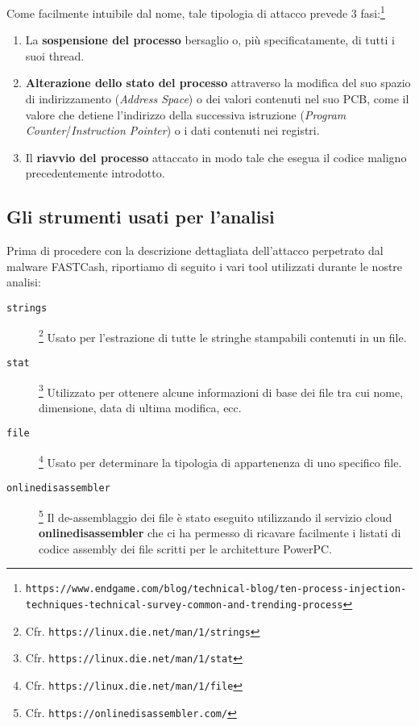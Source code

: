 \documentclass[10pt,a4paper, titlepage]{report}
\begin{document}
Come facilmente intuibile dal nome, tale tipologia di attacco prevede 3 fasi:\footnote{\texttt{https://www.endgame.com/blog/technical-blog/ten-process-injection-techniques-technical-survey-common-and-trending-process}}
\begin{enumerate}
\item La \textbf{sospensione del processo} bersaglio o, più specificatamente, di tutti i suoi thread. 
\item \textbf{Alterazione dello stato del processo} attraverso la modifica del suo spazio di indirizzamento (\textit{Address Space}) o dei valori contenuti nel suo PCB, come il valore che detiene l'indirizzo della successiva istruzione (\textit{Program Counter}/\textit{Instruction Pointer}) o i dati contenuti nei registri.
\item Il \textbf{riavvio del processo} attaccato in modo tale che esegua il codice maligno precedentemente introdotto.
\end{enumerate}

\subsection{Gli strumenti usati per l'analisi}

Prima di procedere con la descrizione dettagliata dell'attacco perpetrato dal malware FASTCash, riportiamo di seguito i vari tool utilizzati durante le nostre analisi:

\begin{description}
\item[\texttt{strings}]\footnote{Cfr. \texttt{https://linux.die.net/man/1/strings}} Usato per l'estrazione di tutte le stringhe stampabili contenuti in un file.
\item[\texttt{stat}]\footnote{Cfr. \texttt{https://linux.die.net/man/1/stat}} Utilizzato per ottenere alcune informazioni di base dei file tra cui nome, dimensione, data di ultima modifica, ecc.
\item[\texttt{file}]\footnote{Cfr. \texttt{https://linux.die.net/man/1/file}} Usato per determinare la tipologia di appartenenza di uno specifico file.
\item[\texttt{onlinedisassembler}]\footnote{Cfr. \texttt{https://onlinedisassembler.com/}} Il de-assemblaggio dei file è stato eseguito utilizzando il servizio cloud \textbf{onlinedisassembler} che ci ha permesso di ricavare facilmente i listati di codice assembly dei file scritti per le architetture PowerPC\texttrademark.
\end{description}
\end{document}
